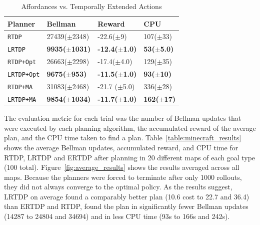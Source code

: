 \documentclass[letterpaper]{article}
\newcommand{\dnote}[1]{\textcolor{Green}{\textbf{}}}
\newcommand{\ra}[1]{\renewcommand{\arraystretch}{#1}} %
\begin{document}
\begin{table}[b]
\ra{1.4}
\begin{tabular}{@{}llll@{}}\toprule
Planner & Bellman & Reward & CPU \\ \midrule
\texttt{RTDP}   			&	27439($\pm$2348)	&	-22.6($\pm$9)	&	107($\pm$33)		\\
\texttt{LRTDP} 			& 	{\bf 9935($\pm$1031)}	&	{\bf -12.4($\pm$1.0)}	&	\bf{53}($\pm$5.0)		\\ \hline
\texttt{RTDP+Opt}  		&	26663($\pm$2298)	&	-17.4($\pm$4.0)	&	129($\pm$35)		\\
\texttt{LRTDP+Opt} 		& 	\bf{9675}($\pm$953)	&	\bf{-11.5}($\pm$1.0)	&	{\bf 93($\pm$10)}	\\ \hline
\texttt{RTDP+MA}  		&	31083($\pm$2468)	&	-21.7	($\pm$5.0)	&	336($\pm$28)		\\
\texttt{LRTDP+MA}  		& 	{\bf 9854($\pm$1034)}	&	{\bf -11.7($\pm$1.0)}	&	{\bf 162($\pm$17)}		\\ %
\bottomrule
\end{tabular}
\label{table:temp_ext_act_results}
\caption{Affordances vs. Temporally Extended Actions}
\end{table}

The evaluation metric for each trial was the number of Bellman updates
that were executed by each planning algorithm, the accumulated reward of the average plan,
and the CPU time taken to find a plan. Table~\ref{table:minecraft_results} shows the average Bellman updates, accumulated reward, and CPU time
for RTDP, LRTDP and ERTDP after planning in 20 different maps of each goal type (100 total). Figure~\ref{fig:average_results} shows the results averaged across all maps. Because the planners were forced to terminate after only 1000 rollouts, they did not always converge to the optimal policy. As the results suggest, LRTDP on average found a comparably better plan (10.6 cost to 22.7 and 36.4) than ERTDP and RTDP, found the plan in significantly fewer Bellman updates (14287 to 24804 and 34694) and in less CPU time (93s to 166s and 242s).

\dnote{Put in a note about the threshold issues, maybe include the results below to reinforce threshold business}
\end{document}
